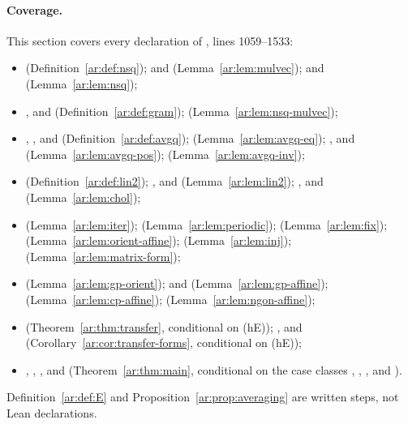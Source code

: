 \paragraph{Coverage.}
This section covers every declaration of , lines 1059--1533:
\begin{itemize}
\item {} (Definition~\ref{ar:def:nsq});  and 
(Lemma~\ref{ar:lem:mulvec});  and  (Lemma~\ref{ar:lem:nsq});
\item {},  and  (Definition~\ref{ar:def:gram}); 
(Lemma~\ref{ar:lem:nsq-mulvec});
\item {}, ,  and  (Definition~\ref{ar:def:avgq}); 
(Lemma~\ref{ar:lem:avgq-eq}); ,  and  (Lemma~\ref{ar:lem:avgq-pos});
 (Lemma~\ref{ar:lem:avgq-inv});
\item {} (Definition~\ref{ar:def:lin2}); ,  and 
(Lemma~\ref{ar:lem:lin2}); ,  and 
(Lemma~\ref{ar:lem:chol});
\item {} (Lemma~\ref{ar:lem:iter}); 
(Lemma~\ref{ar:lem:periodic});  (Lemma~\ref{ar:lem:fix}); 
(Lemma~\ref{ar:lem:orient-affine});  (Lemma~\ref{ar:lem:inj}); 
(Lemma~\ref{ar:lem:matrix-form});
\item {} (Lemma~\ref{ar:lem:gp-orient});  and
 (Lemma~\ref{ar:lem:gp-affine}); 
(Lemma~\ref{ar:lem:cp-affine});  (Lemma~\ref{ar:lem:ngon-affine});
\item {} (Theorem~\ref{ar:thm:transfer}, conditional on (hE));
,  and
 (Corollary~\ref{ar:cor:transfer-forms}, conditional on (hE));
\item {}, ,
,  and
 (Theorem~\ref{ar:thm:main}, conditional on the case classes
, , ,  and ).
\end{itemize}
Definition~\ref{ar:def:E} and Proposition~\ref{ar:prop:averaging} are written steps, not Lean declarations.

